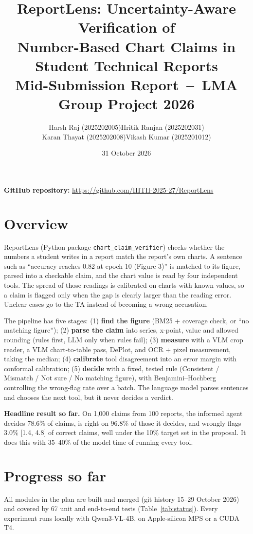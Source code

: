 \documentclass[11pt,a4paper]{article}
\title{\vspace{-1.6cm}\textbf{ReportLens: Uncertainty-Aware Verification of\\Number-Based Chart Claims in Student Technical Reports}\\[4pt]
\large Mid-Submission Report \,--\, LMA Group Project 2026}
\author{\begin{tabular}{ll}
Harsh Raj (2025202005) & \hspace{2em}Hritik Ranjan (2025202031) \\
Karan Thayat (2025202008) & \hspace{2em}Vikash Kumar (2025201012)
\end{tabular}}
\date{\vspace{-10pt}31 October 2026\vspace{-8pt}}
\newcommand{\code}[1]{\texttt{\small #1}}
\begin{document}
\maketitle

\begin{center}
\textbf{GitHub repository:} \url{https://github.com/IIITH-2025-27/ReportLens}
\end{center}

\section{Overview}

ReportLens (Python package \code{chart\_claim\_verifier}) checks whether the numbers a student writes in a report match the report's own charts. A sentence such as ``accuracy reaches 0.82 at epoch 10 (Figure 3)'' is matched to its figure, parsed into a checkable claim, and the chart value is read by four independent tools. The spread of those readings is calibrated on charts with known values, so a claim is flagged only when the gap is clearly larger than the reading error. Unclear cases go to the TA instead of becoming a wrong accusation.

The pipeline has five stages: (1) \textbf{find the figure} (BM25 + coverage check, or ``no matching figure''); (2) \textbf{parse the claim} into series, x-point, value and allowed rounding (rules first, LLM only when rules fail); (3) \textbf{measure} with a VLM crop reader, a VLM chart-to-table pass, DePlot, and OCR + pixel measurement, taking the median; (4) \textbf{calibrate} tool disagreement into an error margin with conformal calibration; (5) \textbf{decide} with a fixed, tested rule (Consistent / Mismatch / Not sure / No matching figure), with Benjamini--Hochberg controlling the wrong-flag rate over a batch. The language model parses sentences and chooses the next tool, but it never decides a verdict.

\textbf{Headline result so far.} On 1{,}000 claims from 100 reports, the informed agent decides 78.6\% of claims, is right on 96.8\% of those it decides, and wrongly flags 3.0\% [1.4, 4.8] of correct claims, well under the 10\% target set in the proposal. It does this with 35--40\% of the model time of running every tool.

\section{Progress so far}

All modules in the plan are built and merged (git history 15--29 October 2026) and covered by 67 unit and end-to-end tests (Table~\ref{tab:status}). Every experiment runs locally with Qwen3-VL-4B, on Apple-silicon MPS or a CUDA T4.
\end{document}
